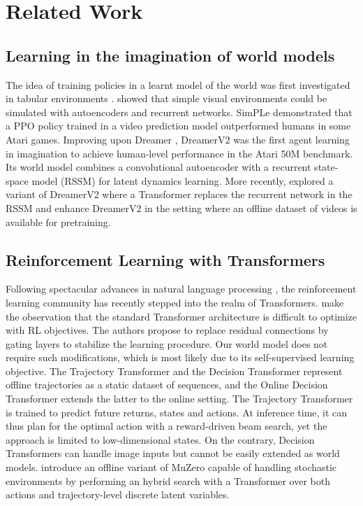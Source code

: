 \section{Related Work}

\subsection*{Learning in the imagination of world models}

The idea of training policies in a learnt model of the world was first investigated in tabular environments \citep{sutton}. \citet{worldmodels} showed that simple visual environments could be simulated with autoencoders and recurrent networks. SimPLe \citep{simple} demonstrated that a PPO policy \citep{ppo} trained in a video prediction model outperformed humans in some Atari games. Improving upon Dreamer \citep{dreamerv1}, DreamerV2 \citep{dreamerv2} was the first agent learning in imagination to achieve human-level performance in the Atari 50M benchmark. Its world model combines a convolutional autoencoder with a recurrent state-space model (RSSM) \citep{planet} for latent dynamics learning. More recently, \citet{transdreamer} explored a variant of DreamerV2 where a Transformer replaces the recurrent network in the RSSM and \citet{action_free_pretraining} enhance DreamerV2 in the setting where an offline dataset of videos is available for pretraining.

\subsection*{Reinforcement Learning with Transformers}

Following spectacular advances in natural language processing \citep{manning}, the reinforcement learning community has recently stepped into the realm of Transformers. \citet{parisotto} make the observation that the standard Transformer architecture is difficult to optimize with RL objectives. The authors propose to replace residual connections by gating layers to stabilize the learning procedure. Our world model does not require such modifications, which is most likely due to its self-supervised learning objective. The Trajectory Transformer \citep{trajectory_transformer} and the Decision Transformer \citep{decision_transformer} represent offline trajectories as a static dataset of sequences, and the Online Decision Transformer \citep{online_dt} extends the latter to the online setting. The Trajectory Transformer is trained to predict future returns, states and actions. At inference time, it can thus plan for the optimal action with a reward-driven beam search, yet the approach is limited to low-dimensional states. On the contrary, Decision Transformers can handle image inputs but cannot be easily extended as world models. \citet{vqplanning} introduce an offline variant of MuZero \citep{muzero} capable of handling stochastic environments by performing an hybrid search with a Transformer over both actions and trajectory-level discrete latent variables. 

